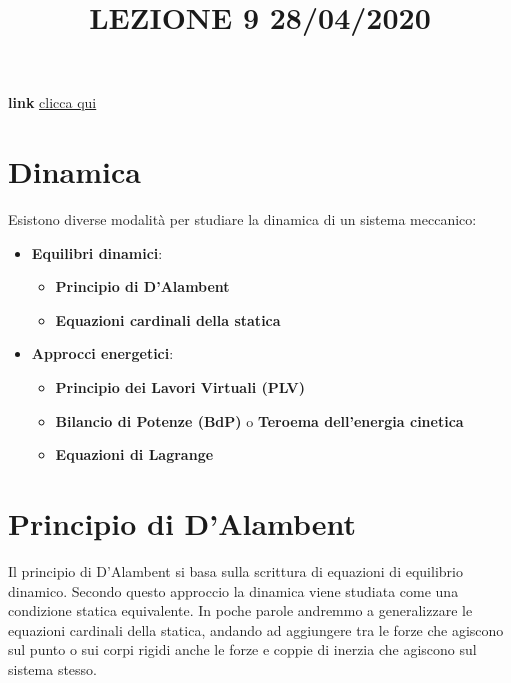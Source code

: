 \title{LEZIONE 9 28/04/2020}\newline
\textbf{link} \href{https://web.microsoftstream.com/video/673607e9-751d-488b-bb1d-79ee783a9b29}{clicca qui}
\section{Dinamica}
Esistono diverse modalità per studiare la dinamica di un sistema meccanico:
\begin{itemize}
    \item \textbf{Equilibri dinamici}:
    \begin{itemize}
        \item \textbf{Principio di D'Alambent}
        \item \textbf{Equazioni cardinali della statica}
    \end{itemize}
    \item \textbf{Approcci energetici}:
    \begin{itemize}
        \item \textbf{Principio dei Lavori Virtuali (PLV)}
        \item \textbf{Bilancio di Potenze (BdP)} o \textbf{Teroema dell'energia cinetica}
        \item \textbf{Equazioni di Lagrange}
    \end{itemize}
\end{itemize}
\newpage
\section{Principio di D'Alambent}
Il principio di D'Alambent si basa sulla scrittura di equazioni di equilibrio dinamico.\newline
\newline
Secondo questo approccio la dinamica viene studiata come una condizione statica equivalente. In poche parole andremmo a generalizzare le equazioni cardinali della statica, andando ad aggiungere tra le forze che agiscono sul punto o sui corpi rigidi anche le forze e coppie di inerzia che agiscono sul sistema stesso.
